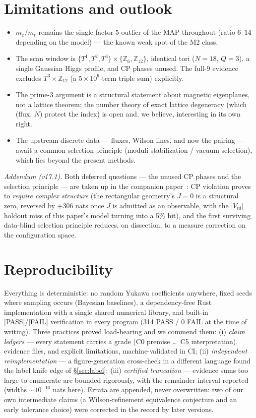 \documentclass[aps,prd,preprint,nofootinbib]{revtex4-2}
\begin{document}
\section{Limitations and outlook}

\begin{itemize}
\item $m_c/m_t$ remains the single factor-5 outlier of the MAP throughout
      (ratio 6--14 depending on the model) --- the known weak spot of the M2
      class.
\item The scan window is $\{T^1,T^2,T^3\}\times\{\mathbb{Z}_6,
      \mathbb{Z}_{12}\}$, identical tori ($N=18$, $Q=3$), a single Gaussian
      Higgs profile, and CP phases unused. The full-9 evidence excludes
      $T^3\times\mathbb{Z}_{12}$ (a $5\times 10^9$-term triple sum) explicitly.
\item The prime-3 argument is a structural statement about magnetic
      eigenplanes, not a lattice theorem; the number theory of exact lattice
      degeneracy (which (flux, $N$) protect the index) is open and, we believe,
      interesting in its own right.
\item The upstream discrete data --- fluxes, Wilson lines, and now the pairing
      --- await a common selection principle (moduli stabilization / vacuum
      selection), which lies beyond the present methods.
\end{itemize}

\emph{Addendum (v17.1).} Both deferred questions --- the unused CP phases and
the selection principle --- are taken up in the companion
paper~\cite{CPpaper}: CP violation proves to \emph{require complex structure}
(the rectangular geometry's $J=0$ is a structural zero, reversed by $+306$ nats
once $J$ is admitted as an observable, with the $|V_{td}|$ holdout miss of this
paper's model turning into a 5\% hit), and the first surviving data-blind
selection principle reduces, on dissection, to a measure correction on the
configuration space.

\section{Reproducibility}

Everything is deterministic: no random Yukawa coefficients anywhere, fixed
seeds where sampling occurs (Bayesian baselines), a dependency-free Rust
implementation with a single shared numerical library, and built-in
[PASS]/[FAIL] verification in every program (314 PASS / 0 FAIL at the time of
writing). Three practices proved load-bearing and we commend them: (i)
\emph{claim ledgers} --- every statement carries a grade (C0 premise \dots\ C5
interpretation), evidence files, and explicit limitations, machine-validated in
CI; (ii) \emph{independent reimplementation} --- a figure-generation
cross-check in a different language found the label knife edge of
\S\ref{sec:label}; (iii) \emph{certified truncation} --- evidence sums too
large to enumerate are bounded rigorously, with the remainder interval reported
(widths $\sim 10^{-10}$ nats here). Errata are appended, never overwritten: two
of our own intermediate claims (a Wilson-refinement equivalence conjecture and
an early tolerance choice) were corrected in the record by later versions.
\end{document}
